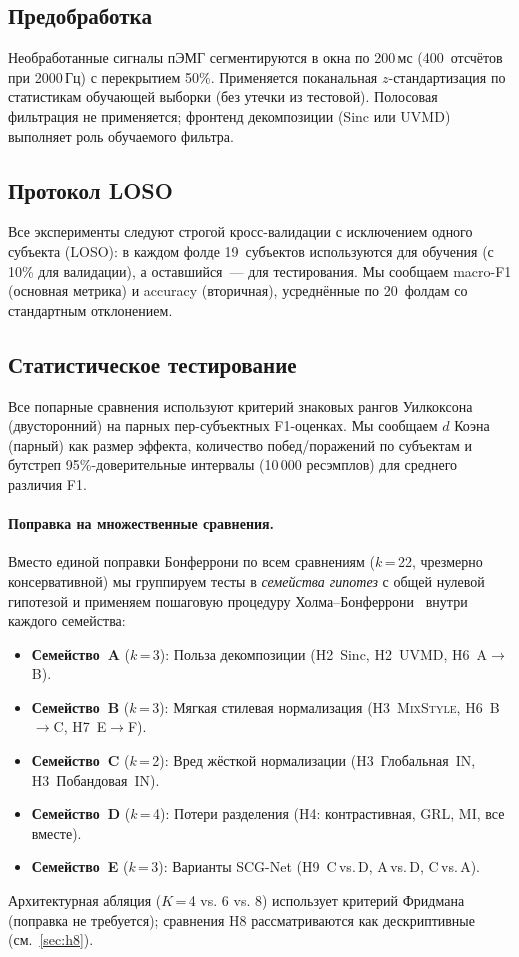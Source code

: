 \documentclass[conference]{IEEEtran}
\newcommand{\mixstyle}{\textsc{MixStyle}}
\newcommand{\uvmd}{\textsc{UVMD}}
\begin{document}
\subsection{Предобработка}
Необработанные сигналы пЭМГ сегментируются в окна по 200\,мс (400~отсчётов при 2000\,Гц) с перекрытием 50\%.
Применяется поканальная $z$-стандартизация по статистикам обучающей выборки (без утечки из тестовой).
Полосовая фильтрация не применяется; фронтенд декомпозиции (Sinc или \uvmd{}) выполняет роль обучаемого фильтра.

\subsection{Протокол LOSO}
Все эксперименты следуют строгой кросс-валидации с исключением одного субъекта (LOSO): в каждом фолде 19~субъектов используются для обучения (с 10\% для валидации), а оставшийся~--- для тестирования.
Мы сообщаем macro-F1 (основная метрика) и accuracy (вторичная), усреднённые по 20~фолдам со стандартным отклонением.

\subsection{Статистическое тестирование}
\label{sec:stats}
Все попарные сравнения используют критерий знаковых рангов Уилкоксона (двусторонний) на парных пер-субъектных F1-оценках.
Мы сообщаем $d$ Коэна (парный) как размер эффекта, количество побед/поражений по субъектам и бутстреп 95\%-доверительные интервалы (10\,000 ресэмплов) для среднего различия F1.

\paragraph{Поправка на множественные сравнения.}
Вместо единой поправки Бонферрони по всем сравнениям ($k$\,=\,22, чрезмерно консервативной) мы группируем тесты в \emph{семейства гипотез} с общей нулевой гипотезой и применяем пошаговую процедуру Холма--Бонферрони~\cite{holm1979simple} внутри каждого семейства:
\begin{itemize}
    \item \textbf{Семейство~A} ($k$\,=\,3): Польза декомпозиции (H2~Sinc, H2~\uvmd{}, H6~A$\to$B).
    \item \textbf{Семейство~B} ($k$\,=\,3): Мягкая стилевая нормализация (H3~\mixstyle{}, H6~B$\to$C, H7~E$\to$F).
    \item \textbf{Семейство~C} ($k$\,=\,2): Вред жёсткой нормализации (H3~Глобальная~IN, H3~Побандовая~IN).
    \item \textbf{Семейство~D} ($k$\,=\,4): Потери разделения (H4: контрастивная, GRL, MI, все вместе).
    \item \textbf{Семейство~E} ($k$\,=\,3): Варианты SCG-Net (H9~C\,vs.\,D, A\,vs.\,D, C\,vs.\,A).
\end{itemize}
Архитектурная абляция ($K$\,=\,4 vs. 6 vs. 8) использует критерий Фридмана (поправка не требуется); сравнения H8 рассматриваются как дескриптивные (см.~\cref{sec:h8}).
\end{document}
